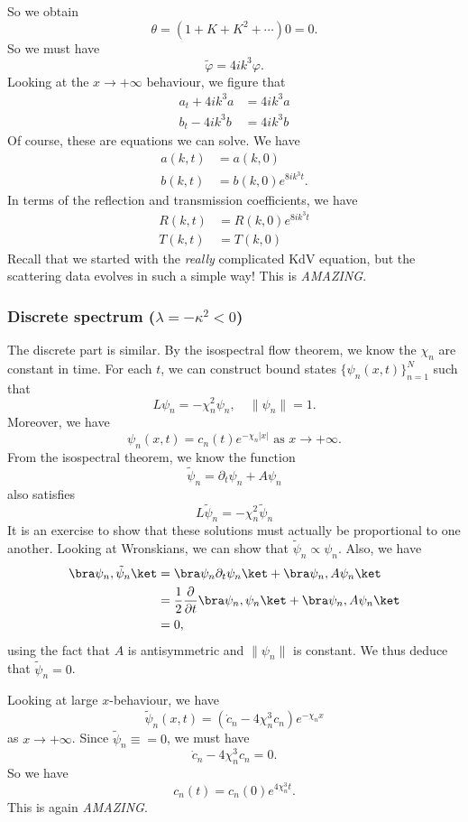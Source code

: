 \documentclass[a4paper]{article}
\begin{document}
So we obtain
\[
  \theta = (1 + K + K^2 + \cdots) 0 = 0.
\]
So we must have
\[
  \tilde{\varphi} = 4ik^3 \varphi.
\]
Looking at the $x \to +\infty$ behaviour, we figure that
\begin{align*}
  a_t + 4ik^3 a &= 4 ik^3 a\\
  b_t - 4ik^3 b &= 4ik^3 b
\end{align*}
Of course, these are equations we can solve. We have
\begin{align*}
  a(k, t) &= a(k, 0)\\
  b(k, t) &= b(k, 0) e^{8ik^3 t}.
\end{align*}
In terms of the reflection and transmission coefficients, we have
\begin{align*}
  R(k, t) &= R(k, 0) e^{8ik^3 t}\\
  T(k, t) &= T(k, 0)
\end{align*}
Recall that we started with the \emph{really} complicated KdV equation, but the scattering data evolves in such a simple way! This is \emph{AMAZING}.

\subsubsection{Discrete spectrum (\texorpdfstring{$\lambda= -\kappa^2 < 0$}{lambda = -kappa^2 < 0})}
The discrete part is similar. By the isospectral flow theorem, we know the $\chi_n$ are constant in time. For each $t$, we can construct bound states $\{\psi_n(x, t)\}_{n = 1}^N$ such that
\[
  L\psi_n = - \chi_n^2 \psi_n,\quad \|\psi_n\| = 1.
\]
Moreover, we have
\[
  \psi_n(x, t) = c_n(t) e^{-\chi_n|x|} \text{ as }x \to +\infty.
\]
From the isospectral theorem, we know the function
\[
  \tilde{\psi}_n = \partial_t \psi_n + A\psi_n
\]
also satisfies
\[
  L\tilde{\psi}_n = - \chi_n^2 \tilde{\psi}_n
\]
It is an exercise to show that these solutions must actually be proportional to one another. Looking at Wronskians, we can show that $\tilde{\psi}_n \propto \psi_n$. Also, we have
\begin{align*}
  \bra \psi_n, \tilde{\psi}_n\ket &= \bra \psi_n \partial_t \psi_n\ket + \bra\psi_n, A \psi_n\ket\\
  &= \frac{1}{2} \frac{\partial}{\partial t} \bra \psi_n, \psi_n\ket + \bra \psi_n, A \psi_n\ket\\
  &= 0,
\end{align*}
using the fact that $A$ is antisymmetric and $\|\psi_n\|$ is constant. We thus deduce that $\tilde{\psi}_n = 0$.

Looking at large $x$-behaviour, we have
\[
  \tilde{\psi}_n(x, t) = (\dot{c}_n - 4 \chi_n^3 c_n) e^{- \chi_n x}
\]
as $x \to +\infty$. Since $\tilde{\psi}_n \equiv = 0$, we must have
\[
  \dot{c}_n - 4 \chi_n^3 c_n = 0.
\]
So we have
\[
  c_n(t) = c_n(0) e^{4 \chi_n^3 t}.
\]
This is again \emph{AMAZING}.
\end{document}
